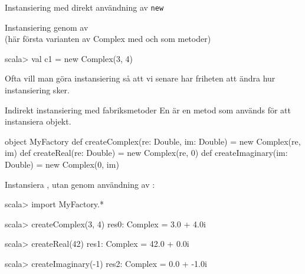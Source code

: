 \begin{Slide}{Instansiering med direkt användning av \texttt{new}}

Instansiering genom  av \\
{\SlideFontSmall (här första varianten av Complex med  och  som metoder)}
\begin{REPLnonum}
scala> val c1 = new Complex(3, 4)
\end{REPLnonum}
\pause
Ofta vill man göra  instansiering så att vi senare har friheten att ändra hur instansiering sker.
\end{Slide}



\begin{Slide}{Indirekt instansiering med fabriksmetoder}\SlideFontSmall
En  är en metod som används för att instansiera objekt.
\begin{Code}[basicstyle=\SlideFontSize{8}{12}\ttfamily\selectfont]
object MyFactory {
  def createComplex(re: Double, im: Double) = new Complex(re, im)
  def createReal(re: Double)                = new Complex(re, 0)
  def createImaginary(im: Double)           = new Complex(0, im)
}
\end{Code}
\pause
Instansiera , utan  genom användning av :
\begin{REPL}
scala> import MyFactory.*

scala> createComplex(3, 4)
res0: Complex = 3.0 + 4.0i

scala> createReal(42)
res1: Complex = 42.0 + 0.0i

scala> createImaginary(-1)
res2: Complex = 0.0 + -1.0i
\end{REPL}
\end{Slide}



